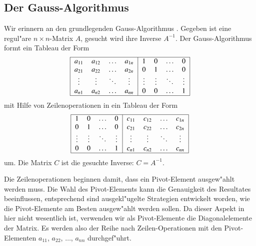 \subsection{Der Gauss-Algorithmus}
Wir erinnern an den grundlegenden Gauss-Algorithmus \cite{skript:linalg}.
Gegeben ist eine regul"are
$n\times n$-Matrix $A$, gesucht wird ihre Inverse $A^{-1}$.
Der Gauss-Algorithmus formt ein Tableau der Form
\begin{equation}
\begin{tabular}{|>{$}c<{$}>{$}c<{$}>{$}c<{$}>{$}c<{$}|>{$}c<{$}>{$}c<{$}>{$}c<{$}>{$}c<{$}|}
\hline
a_{11}&a_{12}&\dots &a_{1n}&1     &0     &\dots &0\\
a_{21}&a_{22}&\dots &a_{2n}&0     &1     &\dots &0\\
\vdots&\vdots&\ddots&\vdots&\vdots&\vdots&\ddots&\vdots\\
a_{n1}&a_{n2}&\dots &a_{nn}&0     &0     &\dots &1\\
\hline
\end{tabular}
\label{starttableau}
\end{equation}
mit Hilfe von Zeilenoperationen in ein Tableau der Form
\begin{equation}
\begin{tabular}{|>{$}c<{$}>{$}c<{$}>{$}c<{$}>{$}c<{$}|>{$}c<{$}>{$}c<{$}>{$}c<{$}>{$}c<{$}|}
\hline
1     &0     &\dots &0     & c_{11}&c_{12}&\dots &c_{1n}\\
0     &1     &\dots &0     & c_{21}&c_{22}&\dots &c_{2n}\\
\vdots&\vdots&\ddots&\vdots& \vdots&\vdots&\ddots&\vdots\\
0     &0     &\dots &1     & c_{n1}&c_{n2}&\dots &c_{nn}\\
\hline
\end{tabular}
\label{targettableau}
\end{equation}
um.
Die Matrix $C$ ist die gesuchte Inverse: $C=A^{-1}$.

Die Zeilenoperationen beginnen damit, dass ein Pivot-Element ausgew"ahlt
werden muss.
Die Wahl des Pivot-Elements kann die Genauigkeit des Resultates beeinflussen,
entsprechend sind ausgekl"ugelte Strategien entwickelt worden, wie die
Pivot-Elemente am Besten ausgew"ahlt werden sollen. Da dieser Aspekt in
hier nicht wesentlich ist, verwenden wir als Pivot-Elemente die
Diagonalelemente der Matrix. Es werden also der Reihe nach Zeilen-Operationen
mit den Pivot-Elementen $a_{11}$, $a_{22}$, $\dots$, $a_{nn}$ 
durchgef"uhrt.

